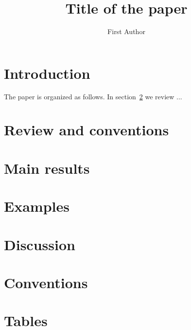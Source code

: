 \documentclass[a4paper,11pt]{article}
\title{Title of the paper}
\author{First Author}
\affiliation{Institute, Address}
\begin{document}
\maketitle

\section{Introduction}

The paper is organized as follows. In section~\ref{sec:review} we review ...

\section{Review and conventions}\label{sec:review}

\section{Main results}\label{sec:main}

\section{Examples}\label{sec:examples}

\section{Discussion}\label{sec:discussion}

\acknowledgments

\appendix
\section{Conventions}\label{app:conventions}
\section{Tables}\label{app:data}



\end{document}
